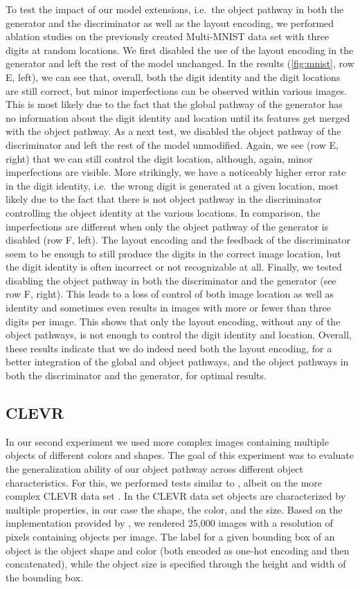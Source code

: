 \documentclass{article} \usepackage{iclr2019_conference,times}
\begin{document}
	To test the impact of our model extensions, i.e.\ the object pathway in both the generator and the discriminator as well as the layout encoding, we performed ablation studies on the previously created Multi-MNIST data set with three digits at random locations.
	We first disabled the use of the layout encoding in the generator and left the rest of the model unchanged.
	In the results (\autoref{fig:mnist}, row E, left), we can see that, overall, both the digit identity and the digit locations are still correct, but minor imperfections can be observed within various images.
	This is most likely due to the fact that the global pathway of the generator has no information about the digit identity and location until its features get merged with the object pathway.
	As a next test, we disabled the object pathway of the discriminator and left the rest of the model unmodified.
	Again, we see (row E, right) that we can still control the digit location, although, again, minor imperfections are visible.
	More strikingly, we have a noticeably higher error rate in the digit identity, i.e.\ the wrong digit is generated at a given location, most likely due to the fact that there is not object pathway in the discriminator controlling the object identity at the various locations.
	In comparison, the imperfections are different when only the object pathway of the generator is disabled (row F, left).
	The layout encoding and the feedback of the discriminator seem to be enough to still produce the digits in the correct image location, but the digit identity is often incorrect or not recognizable at all.
	Finally, we tested disabling the object pathway in both the discriminator and the generator (see row F, right).
	This leads to a loss of control of both image location as well as identity and sometimes even results in images with more or fewer than three digits per image.
	This shows that only the layout encoding, without any of the object pathways, is not enough to control the digit identity and location.
	Overall, these results indicate that we do indeed need both the layout encoding, for a better integration of the global and object pathways, and the object pathways in both the discriminator and the generator, for optimal results.
	
	\subsection{CLEVR}
	In our second experiment we used more complex images containing multiple objects of different colors and shapes.
	The goal of this experiment was to evaluate the generalization ability of our object pathway across different object characteristics.
	For this, we performed tests similar to \citep{rajcompositional}, albeit on the more complex CLEVR data set \citep{johnson2017clevr}.
	In the CLEVR data set objects are characterized by multiple properties, in our case the shape, the color, and the size.
	Based on the implementation provided by \cite{johnson2017clevr}, we rendered 25,000 images with a resolution of  pixels containing  objects per image.
	The label for a given bounding box of an object is the object shape and color (both encoded as one-hot encoding and then concatenated), while the object size is specified through the height and width of the bounding box.
	
\end{document}
